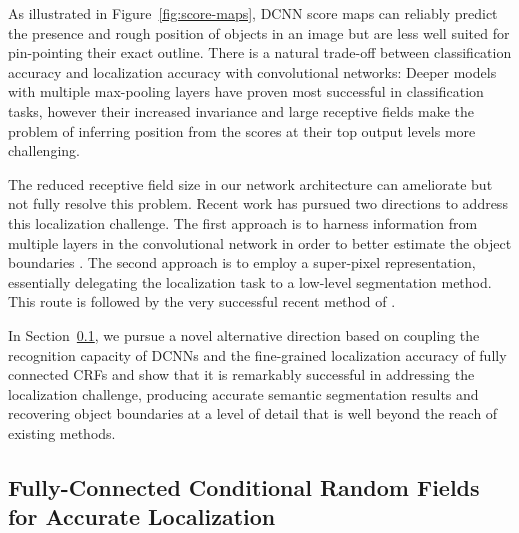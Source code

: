 As illustrated in Figure~\ref{fig:score-maps}, DCNN score maps can
reliably predict the presence and rough position of objects in an image but
are less well suited for pin-pointing their exact outline. There is a natural
trade-off between classification accuracy and localization accuracy with
convolutional networks: Deeper models with multiple max-pooling layers have
proven most successful in classification tasks, however their increased
invariance and large receptive fields make the problem of inferring position
from the scores at their top output levels more challenging.

The reduced receptive field size in our network architecture can ameliorate
but not fully resolve this problem. Recent work has pursued two directions to
address this localization challenge. The first approach is to harness
information from multiple layers in the convolutional network in order to
better estimate the object boundaries \citep{long2014fully, eigen2014predicting}. The second approach is
to employ a super-pixel representation, essentially delegating the
localization task to a low-level segmentation method. This route is followed
by the very successful recent method of \citet{mostajabi2014feedforward}.

In Section~\ref{sec:dense-crf}, we pursue a novel alternative direction based
on coupling the recognition capacity of DCNNs and the fine-grained
localization accuracy of fully connected CRFs and show that it is remarkably
successful in addressing the localization challenge, producing accurate
semantic segmentation results and recovering object boundaries at a level of
detail that is well beyond the reach of existing methods.  


\subsection{Fully-Connected Conditional Random Fields for Accurate Localization}
\label{sec:dense-crf}

